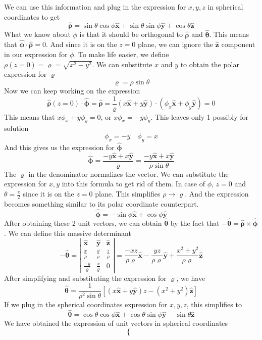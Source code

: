 \documentclass[12pt]{article}
\newcommand{\sqbkt}[1]{\left[ #1 \right]}
\newcommand{\paren}[1]{\left( #1 \right)}
\newcommand{\abso}[1]{\left|#1 \right|}
\newcommand{\unx}{\hat{\mathbf{x}}}
\newcommand{\uny}{\hat{\mathbf{y}}}
\newcommand{\unz}{\hat{\mathbf{z}}}
\newcommand{\untheta}{\hat{\boldsymbol\theta}}
\newcommand{\unphi}{\hat{\boldsymbol\phi}}
\newcommand{\unrho}{\hat{\boldsymbol\rho}}
\begin{document}
\begin{enumerate}
\[    \]
    We can use this information and plug in the expression for $x,y,z$ in spherical coordinates to get
    \[
    \unrho = \sin\theta\cos\phi \unx + \sin\theta\sin\phi\uny + \cos\theta \unz
    \]
    What we know about $\phi$ is that it should be orthogonal to $\unrho$ and $\untheta$. This means that $\unphi \cdot \unrho = 0$. And since it is on the $z=0$ plane, we can ignore the $\unz$ component in our expression for $\phi$. To make life easier, we define $\rho(z=0) = \varrho = \sqrt{x^2 + y^2}$. We can substitute $x$ and $y$ to obtain the polar expression for $\varrho$
    \[
    \varrho = \rho\sin\theta
    \]
    Now we can keep working on the expression
    \[
    \unrho(z=0) \cdot \unphi = \unrho = \frac{1}{\varrho}\paren{x\unx + y\uny} \cdot \paren{\phi_x\unx + \phi_y\uny} = 0
    \]
    This means that $x\phi_x + y\phi_y = 0$, or $x\phi_x = -y\phi_y$. This leaves only 1 possibly for solution
    \[
    \phi_x = -y \quad \phi_y = x
    \]
    And this gives us the expression for $\unphi$
    \[
    \unphi = \frac{-y\unx + x\uny}{\varrho} = \frac{-y\unx + x\uny}{\rho\sin\theta} 
    \]
    The $\varrho$ in the denominator normalizes the vector. We can substitute the expression for $x,y$ into this formula to get rid of them. In case of $\phi$, $z=0$ and $\theta = \frac{\pi}{2}$ since it is on the $z=0$ plane. This simplifies $\rho \to \varrho$. And the expression becomes something similar to its polar coordinate counterpart. 
    \[
    \unphi = -\sin\phi\unx + \cos\phi \uny
    \]
    After obtaining these 2 unit vectors, we can obtain $\untheta$ by the fact that $-\untheta = \unrho \times \unphi$. We can define this massive determinant
    \[
    -\untheta = \abso{
    \begin{matrix}
        \unx & \uny & \unz \\
        \frac{x}{\rho}&\frac{y}{\rho}&\frac{z}{\rho}\\
        \frac{-y}{\varrho}&\frac{x}{\varrho}&0
    \end{matrix}
    } = \frac{-xz}{\rho\varrho}\unx - \frac{yz}{\rho\varrho}\uny + \frac{x^2+y^2}{\rho\varrho}\unz
    \]
    After simplifying and substituting the expression for $\varrho$, we have
    \[
    \untheta = \frac{1}{\rho^2\sin\theta}\sqbkt{\paren{x\unx + y\uny}z - \paren{x^2+y^2}\unz}
    \]
    If we plug in the spherical coordinates expression for $x,y,z$, this simplifies to
    \[
    \untheta = \cos\theta\cos\phi \unx + \cos\theta\sin\phi \uny - \sin\theta \unz
    \]
    We have obtained the expression of unit vectors in spherical coordinates
    \[
    \begin{cases}

\end{cases}\]
\end{enumerate}
\end{document}
